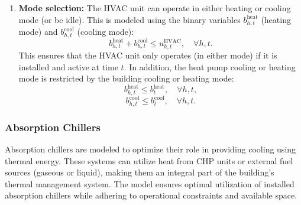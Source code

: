 \documentclass[11pt]{article}
\begin{document}
\begin{enumerate}
    Similarly, the nominal cooling capacity, \(\text{HVAC}^\text{Cmx}_h\), is adjusted using the cooling capacity loss coefficient, \(\text{HVAC}^\text{CmxL}_h\).
    
    The efficiency of the HVAC unit is likewise corrected. The heating efficiency, \(\text{HVAC}^\text{Heff}_h\), is adjusted using the heating efficiency loss coefficient, \(\text{HVAC}^\text{HeffL}_h\): \((1 - \text{HVAC}^\text{HeffL}_h \cdot max(\text{HVAC}^\text{T0}_h - \text{T}^\text{out}_t, 0)\). A lower bound of one is imposed on the corrected efficiency to ensure that it does not fall below a realistic threshold, under extreme outdoor temperatures. In practical terms, an efficiency value below one would imply that the HVAC system is performing worse than a passive electrical resistor.

    The cooling efficiency is adjusted in a similar manner using the cooling efficiency loss coefficient, \(\text{HVAC}^\text{CeffL}_h\)
    
    \item \textbf{Mode selection:}  
    The HVAC unit can operate in either heating or cooling mode (or be idle). This is modeled using the binary variables \(b^\text{heat}_{h,t}\) (heating mode) and \(b^\text{cool}_{h,t}\) (cooling mode):
    \[
    b^\text{heat}_{h,t} + b^\text{cool}_{h,t} \leq u^\text{HVAC}_{h,t}, \quad \forall h, t.
    \]
    This ensures that the HVAC unit only operates (in either mode) if it is installed and active at time \(t\). In addition, the heat pump cooling or heating mode is restricted by the building cooling or heating mode:
    \[
    b^\text{heat}_{h,t} \leq b^\text{heat}_{t}, \quad \forall h, t,
    \]
    \[
    b^\text{cool}_{h,t} \leq b^\text{cool}_{t}, \quad \forall h, t.
    \]
    
\end{enumerate}

\subsubsection{Absorption Chillers}
\label{sec:abc}

Absorption chillers are modeled to optimize their role in providing cooling using thermal energy. These systems can utilize heat from CHP units or external fuel sources (gaseous or liquid), making them an integral part of the building's thermal management system. The model ensures optimal utilization of installed absorption chillers while adhering to operational constraints and available space.
\end{document}
